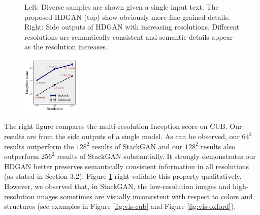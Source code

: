 \documentclass[10pt,twocolumn,letterpaper]{article}
\begin{document}
\begin{figure}[t]
\begin{subfigure}[t]{0.3\textwidth}
	\end{subfigure}
	\vspace{-.2cm}
	\caption{Left: Diverse samples are shown given a single input text. The proposed HDGAN (top) show obviously more fine-grained details. Right: Side outputs of HDGAN with increasing resolutions. Different resolutions are semantically consistent and semantic details appear as the resolution increases.  \label{fig:multiple-test}} 	\vspace{-.3cm}
\end{figure}


\begingroup
\setlength{\intextsep}{-4pt}%
\setlength{\columnsep}{0pt}%
\begin{figure}
	\centering
	\includegraphics[width=0.245\textwidth]{figure/multiscale_Inception_2.pdf}
	\vspace{-12pt}
\end{figure}
The right figure compares the multi-resolution Inception score on CUB. Our results are from the side outputs of a single model. As can be observed, our $64^2$ results outperform the $128^2$ results of StackGAN and our $128^2$ results also outperform $256^2$ results of StackGAN substantially. It strongly demonstrates our HDGAN better preserves semantically consistent information in all resolutions (as stated in Section 3.2). Figure \ref{fig:multiple-test} right validate this property qualitatively. However, we observed that, in StackGAN, the low-resolution images and high-resolution images sometimes are visually inconsistent with respect to colors and structures (see examples in Figure \ref{fig:vis-cub} and Figure \ref{fig:vis-oxford}).
\end{document}
